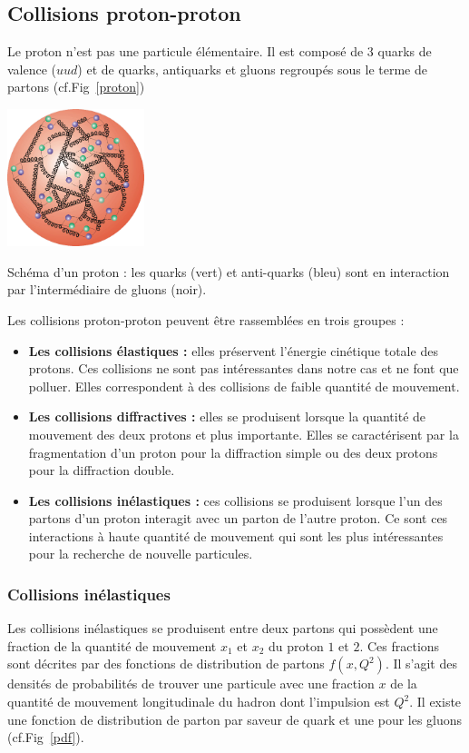 \subsection{Collisions proton-proton}
Le proton n'est pas une particule élémentaire. Il est composé de \num{3} quarks de valence ($uud$) et de quarks, antiquarks et gluons regroupés sous le terme de partons (cf.Fig~\ref{proton})

\begin{minipagewithmarginpars}[ht!]{0.95\textwidth}
\centering
\includegraphics[width=0.3\textwidth]{SM/quarks3.png}
\captionsetup{type=figure}\caption{Schéma d'un proton : les quarks (vert) et anti-quarks (bleu) sont en interaction par l'intermédiaire de gluons (noir).}
\label{proton}	
\end{minipagewithmarginpars}

Les collisions proton-proton peuvent être rassemblées en trois groupes :
\begin{itemize}[label=$\bullet$]
	\item \textbf{Les collisions élastiques : } elles préservent l'énergie cinétique totale des protons. Ces collisions ne sont pas intéressantes dans notre cas et ne font que polluer. Elles correspondent à des collisions de faible quantité de mouvement.
	\item\textbf{Les collisions diffractives : } elles se produisent lorsque la quantité de mouvement des deux protons et plus importante. Elles se caractérisent par la fragmentation d'un proton pour la diffraction simple ou des deux protons pour la diffraction double.
	\item \textbf{Les collisions inélastiques : } ces collisions se produisent lorsque l'un des partons d'un proton interagit avec un parton de l'autre proton. Ce sont ces interactions à haute quantité de mouvement qui sont les plus intéressantes pour la recherche de nouvelle particules.
\end{itemize}

\subsubsection{Collisions inélastiques}
Les collisions inélastiques se produisent entre deux partons qui possèdent une fraction de la quantité de mouvement $x_{1}$ et $x_{2}$ du proton $1$ et $2$. Ces fractions sont décrites par des fonctions de distribution de partons $f(x,Q^{2})$. Il s'agit des densités de probabilités de trouver une particule avec une fraction $x$ de la quantité de mouvement longitudinale du hadron dont l'impulsion est $Q^{2}$. Il existe une fonction de distribution de parton par saveur de quark et une pour les gluons (cf.Fig~\ref{pdf}).

